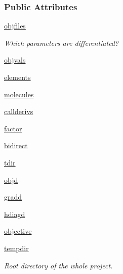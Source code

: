 \subsubsection*{Public Attributes}
\begin{DoxyCompactItemize}
\item 
\hyperlink{classforcebalance_1_1psi4io_1_1RDVR3__Psi4_adf77b8bc3f7d87d426e2bc539e2bc536}{objfiles}
\begin{DoxyCompactList}\small\item\em Which parameters are differentiated? \end{DoxyCompactList}\item 
\hyperlink{classforcebalance_1_1psi4io_1_1RDVR3__Psi4_a044c425337f42fa43a7d8a7010057ac8}{objvals}
\item 
\hyperlink{classforcebalance_1_1psi4io_1_1RDVR3__Psi4_af55d3d535249fb29e26f7fd236f6b08e}{elements}
\item 
\hyperlink{classforcebalance_1_1psi4io_1_1RDVR3__Psi4_ae0490cebed3a59e1989031dd63872d3c}{molecules}
\item 
\hyperlink{classforcebalance_1_1psi4io_1_1RDVR3__Psi4_aac0fda10840086df3d343c722addbb3c}{callderivs}
\item 
\hyperlink{classforcebalance_1_1psi4io_1_1RDVR3__Psi4_a032ae110d73b70f0a1fbb36b2332dfb2}{factor}
\item 
\hyperlink{classforcebalance_1_1psi4io_1_1RDVR3__Psi4_ad8462b966b5eecdbed361f33d2f183ea}{bidirect}
\item 
\hyperlink{classforcebalance_1_1psi4io_1_1RDVR3__Psi4_afba333b01de406679320bd268435fd94}{tdir}
\item 
\hyperlink{classforcebalance_1_1psi4io_1_1RDVR3__Psi4_a5e419082b7b8baf9cf55e4f6f272053e}{objd}
\item 
\hyperlink{classforcebalance_1_1psi4io_1_1RDVR3__Psi4_a914598ce5fac2ce75e305409e975d8be}{gradd}
\item 
\hyperlink{classforcebalance_1_1psi4io_1_1RDVR3__Psi4_a0faae382ff2a46e2fa9b843a2963a5b8}{hdiagd}
\item 
\hyperlink{classforcebalance_1_1psi4io_1_1RDVR3__Psi4_a17d4564604f719bcd7a6ffac59648cbe}{objective}
\item 
\hyperlink{classforcebalance_1_1target_1_1Target_aa1f01b5b78db253b5b66384ed11ed193}{tempdir}
\begin{DoxyCompactList}\small\item\em Root directory of the whole project. \end{DoxyCompactList}\item 

\end{DoxyCompactItemize}
